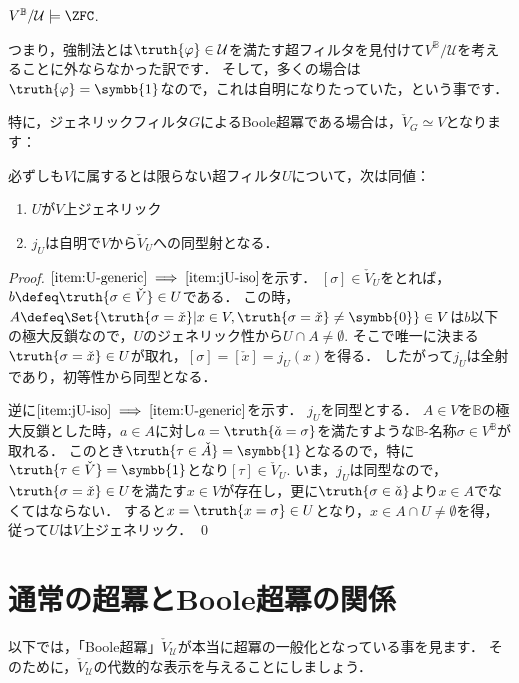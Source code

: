 \documentclass[a4j]{ltjsarticle}
\newcommand{\mathds}[1]{\symbb{#1}}
\begin{document}
\begin{corollary}
 $V^{\mathbb{B}}/\mathcal{U} \models \ZFC$.
\end{corollary}

つまり，強制法とは$\truth{\varphi} \in \mathcal{U}$を満たす超フィルタを見付けて$V^{\mathbb{B}}/\mathcal{U}$を考えることに外ならなかった訳です．
そして，多くの場合は$\truth{\varphi} = \mathds{1}$なので，これは自明になりたっていた，という事です．

特に，ジェネリックフィルタ$G$によるBoole超冪である場合は，$\check{V}_G \simeq V$となります：

\begin{theorem}
 必ずしも$V$に属するとは限らない超フィルタ$U$について，次は同値：
 \begin{enumerate}
  \item \label{item:U-generic}$U$が$V$上ジェネリック
  \item \label{item:jU-iso}$j_U$は自明で$V$から$\check{V}_U$への同型射となる．
 \end{enumerate}
\end{theorem}
\begin{proof}
 $\ref{item:U-generic} \implies \ref{item:jU-iso}$を示す．
 $[\sigma] \in \check{V}_U$をとれば，$b \defeq \truth{\sigma \in \check{V}} \in U$である．
 この時，$A \defeq \Set{ \truth{\sigma = \check{x}} | x \in V, \truth{\sigma = \check{x}} \neq \mathds{0}} \in V$は$b$以下の極大反鎖なので，$U$のジェネリック性から$U \cap A \neq \emptyset$.
 そこで唯一に決まる$\truth{\sigma = \check{x}} \in U$が取れ，$[\sigma] = [\check{x}] = j_U(x)$を得る．
 したがって$j_U$は全射であり，初等性から同型となる．

 逆に$\ref{item:jU-iso} \implies \ref{item:U-generic}$を示す．
 $j_U$を同型とする．
 $A \in V$を$\mathbb{B}$の極大反鎖とした時，$a \in A$に対し$a = \truth{\check{a} = \sigma}$を満たすような$\mathbb{B}$-名称$\sigma \in V^{\mathbb{B}}$が取れる．
 このとき$\truth{\tau \in \check{A}} = \mathds{1}$となるので，特に$\truth{\tau \in \check{V}} = \mathds{1}$となり$[\tau] \in \check{V}_U$.
 いま，$j_U$は同型なので，$\truth{\sigma = \check{x}} \in U$を満たす$x \in V$が存在し，更に$\truth{\sigma \in \check{a}}$より$x \in A$でなくてはならない．
 すると$x = \truth{x = \sigma} \in U$となり，$x \in A \cap U \neq \emptyset$を得，
 従って$U$は$V$上ジェネリック． \qed
\end{proof}

\section{通常の超冪とBoole超冪の関係}
以下では，「Boole超冪」$\check{V}_{\mathcal{U}}$が本当に超冪の一般化となっている事を見ます．
そのために，$\check{V}_{\mathcal{U}}$の代数的な表示を与えることにしましょう．
\end{document}
